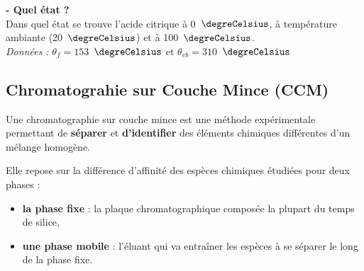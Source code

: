 \newpage

\begin{mdframed}[style=autreexo]
\textbf{ - Quel état ?}\\
Dans quel état se trouve l'acide citrique à 0~$\degreCelsius$, à température ambiante (20~$\degreCelsius$) et à 100~$\degreCelsius$.\\
\textit{Données :} $\theta_f=153$~$\degreCelsius$ et $\theta_{eb}=310$~$\degreCelsius$
\end{mdframed}
\vspace{2cm}
\subsection{Chromatograhie sur Couche Mince (CCM)}

\begin{tcolorbox}[colback=green!5!white,colframe=green!75!black,title=\textbf{CCM }, upperbox=invisible]
Une chromatographie sur couche mince est une méthode expérimentale permettant de \textbf{séparer} et \textbf{d'identifier} des éléments chimiques différentes d'un mélange homogène.
\newline
\newline 
\newline
\end{tcolorbox}
Elle repose sur la différence d'affinité des espèces chimiques étudiées pour deux phases :
\begin{itemize}
    \item \textbf{la phase fixe} : la plaque chromatographique composée la plupart du temps de silice,
    \item \textbf{une phase mobile} : l'éluant qui va entraîner les espèces à se séparer le long de la phase fixe.
\end{itemize}

